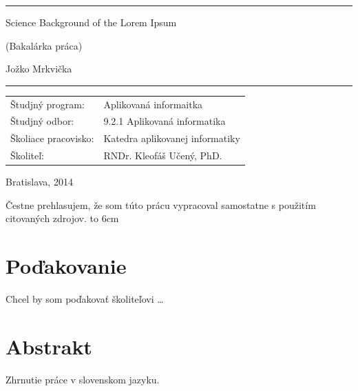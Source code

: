 \documentclass[12pt,oneside,a4paper]{book}
\def\title{Science Background of the Lorem Ipsum}
\def\thesis{Bakalárka práca}
\def\author{Jožko Mrkvička}
\def\year{2014}
\def\placeandyear{Bratislava, \year}
\def\supervisor{RNDr. Kleofáš Učený, PhD.\ }
\def\studyprogramme{Aplikovaná informaitka}
\def\studyfield{9.2.1 Aplikovaná informatika}
\def\department{Katedra aplikovanej informatiky}
\begin{document}
\vfill
\begin{center}
\begin{minipage}{0.8\textwidth}
\hrule
\bigskip\bigskip
\begin{center}
{\LARGE\sc \title}
\end{center}
\smallskip
\centerline{(\thesis)}
\bigskip
\bigskip
\centerline{\large\sc \author}
\bigskip\bigskip
\hrule
\end{minipage}
\end{center}

\vfill
\begin{flushleft}
  \begin{tabular}{@{}ll}
    Študjný program: & \studyprogramme \\
    Študjný odbor: & \studyfield \\
    Školiace pracovisko: & \department \\
    Školiteľ: & \supervisor
  \end{tabular}
  \vspace{1cm}

  \placeandyear\\
\end{flushleft}

\newpage
\begin{minipage}{1.00\textwidth}
\vspace{15.6cm}
Čestne prehlasujem, že som túto prácu vypracoval samostatne s použitím citovaných
zdrojov.
\vfill
\vspace{2.5cm}
\hfill\hbox to 6cm{\dotfill}
\end{minipage}

\newpage
\chapter*{Poďakovanie}
\vfil
Chcel by som poďakovať školiteľovi \ldots

\chapter*{Abstrakt}
Zhrnutie práce v slovenskom jazyku.
\end{document}
